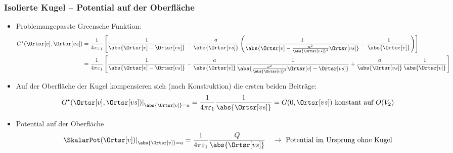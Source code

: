   \begin{frame}
    \frametitle{Isolierte Kugel -- Potential auf der Oberfläche}
    \begin{itemize}[<+->]
    \item Problemangepasste Greensche Funktion:
      \begin{align*}
        G^\star(\Ortsr[v], \Ortsr[vs])  & = \frac{1}{4\pi\varepsilon_1} \left[ \frac{1}{\abs{\Ortsr[v] - \Ortsr[vs]}} - \frac{a}{\abs{\Ortsr[vs]}} \left( \frac{1}{\abs{\Ortsr[v]- \frac{a^2}{\abs{\Ortsr[vs]}^2} \Ortsr[vs]}} - \frac{1}{ \abs{\Ortsr[v]}} \right) \right] \\
                                                  & = \frac{1}{4\pi\varepsilon_1} \left[
                                                    \frac{1}{\abs{\Ortsr[v] - \Ortsr[vs]}}
                                                    - \frac{a}{\abs{\Ortsr[v]}} \frac{1}{\abs{\frac{a^2}{\abs{\Ortsr[v]}^2} \Ortsr[v] - \Ortsr[vs]}}
                                                    +\frac{a}{\abs{\Ortsr[vs]}} \frac{1}{ \abs{\Ortsr[v]}}
                                                    \right]
      \end{align*}
    \item Auf der Oberfläche der Kugel kompensieren sich (nach Konstruktion) die ersten beiden Beiträge:
      \begin{equation*}
        \left. G^\star(\Ortsr[v], \Ortsr[vs])\right|_{\abs{\Ortsr[v]}=a} = \frac{1}{4\pi\varepsilon_1} \frac{1}{\abs{\Ortsr[vs]}} = G(0,\Ortsr[vs]) \text{ konstant auf } O(V_2) 
      \end{equation*}
      \item Potential auf der Oberfläche
      \begin{equation*}
        \left. \SkalarPot(\Ortsr[v])\right|_{\abs{\Ortsr[v]}=a} = \frac{1}{4\pi\varepsilon_1} \frac{Q}{\abs{\Ortsr[vs]}} \quad \to \text{ Potential im Ursprung ohne Kugel} 
      \end{equation*}
      \end{itemize}
\end{frame}




